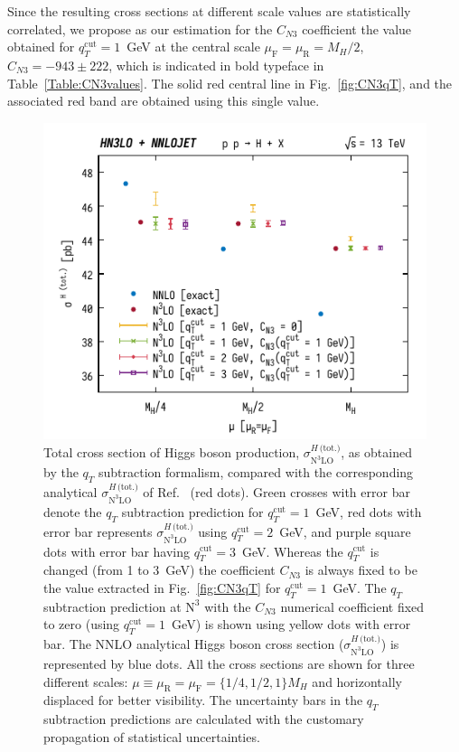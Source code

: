 \documentclass[12pt]{article}
\DeclareRobustCommand{\mur}{\ensuremath{\mu_{\mathrm{R}}}\xspace}
\DeclareRobustCommand{\muR}{\mur}
\DeclareRobustCommand{\muf}{\ensuremath{\mu_{\mathrm{F}}}\xspace}
\DeclareRobustCommand{\muF}{\muf}
\DeclareRobustCommand{\qt}{\ensuremath{q_T}\xspace}
\DeclareRobustCommand{\qtcut}{\ensuremath{q_T^\mathrm{cut}}\xspace}
\DeclareRobustCommand{\tot}{\text{(tot.)}\xspace}
\DeclareRobustCommand{\LO}{\text{LO}\xspace}
\DeclareRobustCommand{\N}[1]{\ensuremath{\text{N}^{#1}}} %
\begin{document}
Since the resulting cross sections at different scale values are statistically correlated, we propose as our estimation for the $C_{N3}$ coefficient the value obtained for  $\qtcut=1$~GeV   at the central scale $\muF=\muR=M_{H}/2$, $C_{N3}=-943 \pm 222$, which is indicated in bold typeface in Table~\ref{Table:CN3values}.
The solid red central line in Fig.~\ref{fig:CN3qT}, and the associated red band are obtained using this single value. 

\begin{figure}
\centering
\includegraphics[width=.6\linewidth]{./JHEP_figures/totXsecN3LO}
\caption{\label{fig:totXsecN3LO}{Total cross section of Higgs boson production, $\sigma^{H\,\tot}_{\N{3}\LO}$, as obtained by the $\qt$ subtraction formalism, compared with the corresponding analytical $\sigma^{H\,\tot}_{\N3\LO}$ of Ref.~\cite{Mistlberger:2018etf} (red dots). Green crosses with error bar denote the $\qt$ subtraction prediction for $\qtcut=1$~GeV, red dots with error bar represents  $\sigma^{H\,\tot}_{\N3\LO}$ using $\qtcut=2$~GeV, and purple square dots with error bar having $\qtcut=3$~GeV. Whereas the $\qtcut$ is changed (from 1 to 3~GeV) the coefficient $C_{N3}$ is always fixed to be the value extracted in Fig.~\ref{fig:CN3qT} for $\qtcut=1$~GeV. The $\qt$ subtraction prediction at \N3\LO with the $C_{N3}$ numerical coefficient fixed to zero (using $\qtcut=1$~GeV) is shown using yellow dots with error bar. The NNLO analytical Higgs boson cross section ($\sigma^{{H\,\tot}}_{\N3\LO}$) is represented by blue dots. All the cross sections are shown for three different scales: $\mu \equiv \muR = \muF = \{1/4,1/2,1 \} M_H$ and horizontally displaced for better visibility. The uncertainty bars in the $\qt$ subtraction predictions are calculated with the customary propagation of statistical uncertainties.}}
\end{figure}
\end{document}
